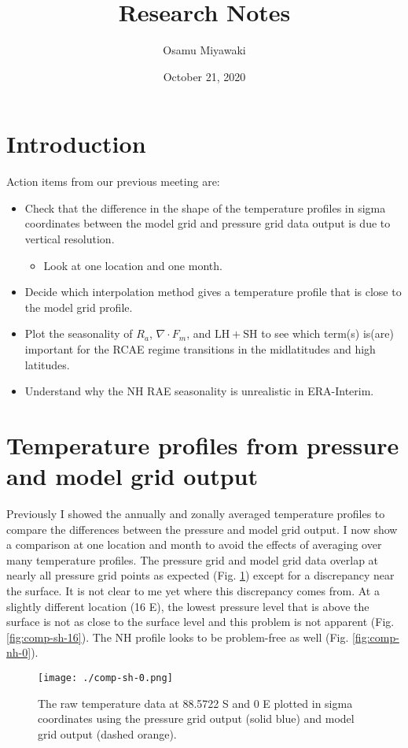 \documentclass[11pt]{article}
\author{Osamu Miyawaki}
\date{October 21, 2020}
\title{Research Notes}
\begin{document}
\maketitle

\section{Introduction}
\label{sec:org4bb1a84}
Action items from our previous meeting are:
\begin{itemize}
\item Check that the difference in the shape of the temperature profiles in sigma coordinates between the model grid and pressure grid data output is due to vertical resolution.
\begin{itemize}
\item Look at one location and one month.
\end{itemize}
\item Decide which interpolation method gives a temperature profile that is close to the model grid profile.
\item Plot the seasonality of \(R_a\), \(\nabla\cdot F_m\), and \(\mathrm{LH+SH}\) to see which term(s) is(are) important for the RCAE regime transitions in the midlatitudes and high latitudes.
\item Understand why the NH RAE seasonality is unrealistic in ERA-Interim.
\end{itemize}

\section{Temperature profiles from pressure and model grid output}
\label{sec:org19eabf8}
Previously I showed the annually and zonally averaged temperature profiles to compare the differences between the pressure and model grid output. I now show a comparison at one location and month to avoid the effects of averaging over many temperature profiles. The pressure grid and model grid data overlap at nearly all pressure grid points as expected (Fig. \ref{fig:comp-sh-0}) except for a discrepancy near the surface. It is not clear to me yet where this discrepancy comes from. At a slightly different location (16 E), the lowest pressure level that is above the surface is not as close to the surface level and this problem is not apparent (Fig. \ref{fig:comp-sh-16}). The NH profile looks to be problem-free as well (Fig. \ref{fig:comp-nh-0}).

\begin{figure}[htbp]
\centering
\texttt{[image: ./comp-sh-0.png]}
\caption{\label{fig:comp-sh-0}The raw temperature data at 88.5722 S and 0 E plotted in sigma coordinates using the pressure grid output (solid blue) and model grid output (dashed orange).}
\end{figure}
\end{document}
